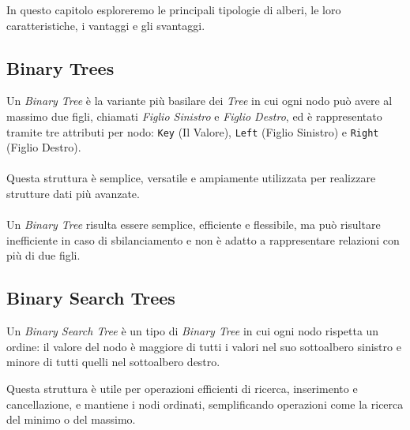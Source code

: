 \documentclass[12pt,a4paper,openright,twoside]{book}
\begin{document}
        In questo capitolo esploreremo le principali tipologie di alberi, le loro caratteristiche, i vantaggi e gli svantaggi.

        \subsection{Binary Trees}

            Un \textit{Binary Tree} è la variante più basilare dei \textit{Tree} in cui ogni nodo può avere al massimo due figli, chiamati \textit{Figlio Sinistro} e \textit{Figlio Destro}, ed è rappresentato tramite tre attributi per nodo: \texttt{Key} (Il Valore), \texttt{Left} (Figlio Sinistro) e \texttt{Right} (Figlio Destro).

            \paragraph*{}

            Questa struttura è semplice, versatile e ampiamente utilizzata per realizzare strutture dati più avanzate.

            \paragraph*{}

            Un \textit{Binary Tree} risulta essere semplice, efficiente e flessibile, ma può risultare inefficiente in caso di sbilanciamento e non è adatto a rappresentare relazioni con più di due figli.

        \subsection{Binary Search Trees}

            Un \textit{Binary Search Tree} è un tipo di \textit{Binary Tree} in cui ogni nodo rispetta un ordine: il valore del nodo è maggiore di tutti i valori nel suo sottoalbero sinistro e minore di tutti quelli nel sottoalbero destro.

            \pagebreak

            Questa struttura è utile per operazioni efficienti di ricerca, inserimento e cancellazione, e mantiene i nodi ordinati, semplificando operazioni come la ricerca del minimo o del massimo.

            \paragraph*{}
\end{document}

